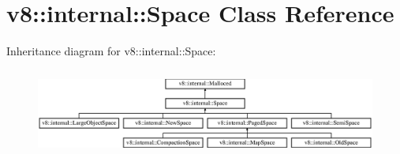 \hypertarget{classv8_1_1internal_1_1_space}{}\section{v8\+:\+:internal\+:\+:Space Class Reference}
\label{classv8_1_1internal_1_1_space}
Inheritance diagram for v8\+:\+:internal\+:\+:Space\+:\begin{figure}[H]
\begin{center}
\leavevmode
\includegraphics[height=2.886598cm]{classv8_1_1internal_1_1_space}
\end{center}
\end{figure}
